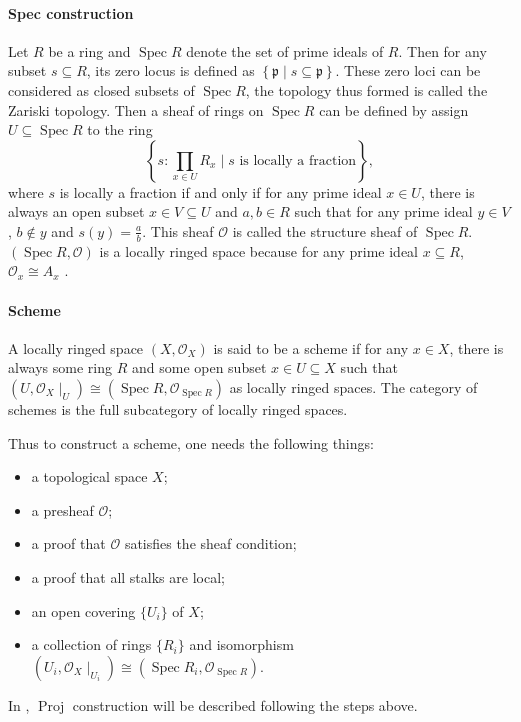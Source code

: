 \documentclass[a4paper,UKenglish,cleveref, autoref, thm-restate]{lipics-v2021}
\begin{document}
\paragraph*{Spec construction} Let $R$ be a ring and $\operatorname{Spec} R$ denote the set of prime ideals of $R$. Then for any subset $s \subseteq R$, its zero locus is defined as $\left\{\mathfrak{p} \mid s \subseteq \mathfrak{p}\right\}$. These zero loci can be considered as closed subsets of $\operatorname{Spec} R$, the topology thus formed is called the Zariski topology. Then a sheaf of rings on $\operatorname{Spec} R$ can be defined by assign $U \subseteq \operatorname{Spec} R$ to the ring
$$
\left\{s : \prod_{x \in U} R_x \mid s \text{~is locally a fraction}\right\},
$$
where $s$ is locally a fraction if and only if for any prime ideal $x \in U$, there is always an open subset $x \in V \subseteq U$ and $a, b \in R$ such that for any prime ideal $y \in V$, $b \not\in y$ and $s(y) = \frac{a}{b}$. This sheaf $\mathcal{O}$ is called the structure sheaf of $\operatorname{Spec}R$. $(\operatorname{Spec} R, \mathcal{O})$ is a locally ringed space because for any prime ideal $x\subseteq R$, $\mathcal{O}_{x}\cong A_x$ \cite{hartshorne1977graduate}.

\paragraph*{Scheme}

\begin{definition}[Scheme]
    A locally ringed space $(X, \mathcal{O}_X)$ is said to be a scheme if for any $x \in X$, there is always some ring $R$ and some open subset $x \in U \subseteq X$ such that $(U, \mathcal{O}_X\!\mid_U) \cong (\operatorname{Spec} R, \mathcal{O}_{\operatorname{Spec} R})$ as locally ringed spaces. The category of schemes is the full subcategory of locally ringed spaces.
\end{definition}

Thus to construct a scheme, one needs the following things:
\begin{itemize}
    \item a topological space $X$;
    \item a presheaf $\mathcal{O}$;
    \item a proof that $\mathcal{O}$ satisfies the sheaf condition;
    \item a proof that all stalks are local;
    \item an open covering $\{U_i\}$ of $X$;
    \item a collection of rings $\{R_i\}$ and isomorphism $(U_i, \mathcal{O}_X\!\mid_{U_i})\cong(\operatorname{Spec}R_i, \mathcal{O}_{\operatorname{Spec} R})$.
\end{itemize}
In , $\operatorname{Proj}$ construction will be described following the steps above.
\end{document}

